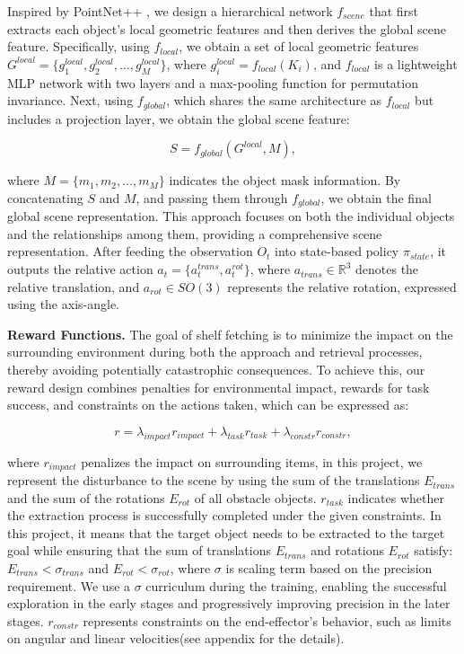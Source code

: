 Inspired by PointNet++ \cite{qi2017pointnet++}, we design a hierarchical network \( f_{{scene}} \) that first extracts each object's local geometric features and then derives the global scene feature. Specifically, using \( f_{{local}} \), we obtain a set of local geometric features \( G^{{local}} = \{ g_{1}^{{local}}, g_{2}^{{local}}, \dots, g_{M}^{{local}} \} \), where \( g_{i}^{{local}} = f_{{local}}(K_{i}) \), and \( f_{{local}} \) is a lightweight MLP network with two layers and a max-pooling function for permutation invariance. Next, using \( f_{{global}} \), which shares the same architecture as \( f_{{local}} \) but includes a projection layer, we obtain the global scene feature:

\[
S = f_{{global}}(G^{{local}}, M),
\]

where \( M = \{ m_{1}, m_{2}, \dots, m_{M} \} \) indicates the object mask information. By concatenating \( S \) and \( M \), and passing them through \( f_{{global}} \), we obtain the final global scene representation. This approach focuses on both the individual objects and the relationships among them, providing a comprehensive scene representation.
After feeding the observation $O_t$ into state-based policy $\pi_{state}$, it outputs the relative action $a_{t} = \{a_{t}^{trans}, a_{t}^{rot}\}$, where $a_{trans} \in \mathbb{R}^{3}$ denotes the relative translation, and $a_{{rot}} \in SO(3)$ represents the relative rotation, expressed using the axis-angle. 

\textbf{Reward Functions.}
The goal of shelf fetching is to minimize the impact on the surrounding environment during both the approach and retrieval processes, thereby avoiding potentially catastrophic consequences. To achieve this, our reward design combines penalties for environmental impact, rewards for task success, and constraints on the actions taken, which can be expressed as:

\[
r = \lambda_{{impact}} r_{{impact}} + \lambda_{{task}} r_{{task}} + \lambda_{{constr}} r_{{constr}},
\]

where  \( r_{{impact}} \) penalizes the impact on surrounding items, in this project, we represent the disturbance to the scene by using the sum of the translations $E_{trans}$ and the sum of the rotations $E_{rot}$ of all obstacle objects. \( r_{{task}} \) indicates whether the extraction process is successfully completed under the given constraints. In this project, it means that the target object needs to be extracted to the target goal while ensuring that the sum of translations $E_{trans}$ and rotations $E_{rot}$ satisfy: $E_{trans} < \sigma_{trans}$ and $E_{rot} < \sigma_{rot}$, where $\sigma$ is scaling term based on the precision requirement. We use a $\sigma$ curriculum during the training, enabling the successful exploration in the early stages and progressively improving precision in the later stages. \( r_{{constr}} \) represents constraints on the end-effector's behavior, such as limits on angular and linear velocities(see appendix for the details).

